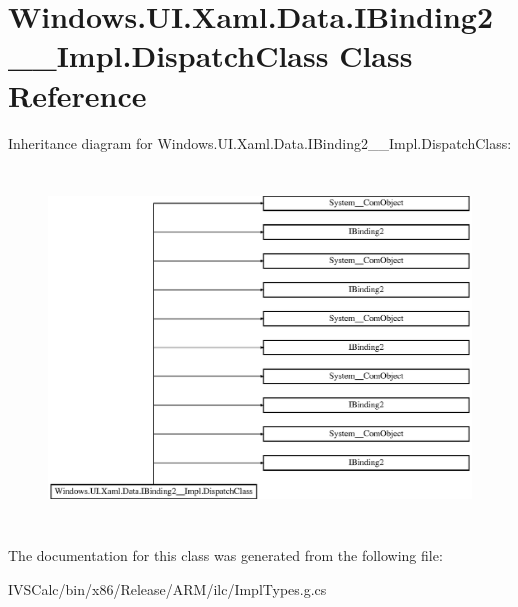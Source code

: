 \hypertarget{class_windows_1_1_u_i_1_1_xaml_1_1_data_1_1_i_binding2_____impl_1_1_dispatch_class}{}\section{Windows.\+U\+I.\+Xaml.\+Data.\+I\+Binding2\+\_\+\+\_\+\+Impl.\+Dispatch\+Class Class Reference}
\label{class_windows_1_1_u_i_1_1_xaml_1_1_data_1_1_i_binding2_____impl_1_1_dispatch_class}
Inheritance diagram for Windows.\+U\+I.\+Xaml.\+Data.\+I\+Binding2\+\_\+\+\_\+\+Impl.\+Dispatch\+Class\+:\begin{figure}[H]
\begin{center}
\leavevmode
\includegraphics[height=9.535604cm]{class_windows_1_1_u_i_1_1_xaml_1_1_data_1_1_i_binding2_____impl_1_1_dispatch_class}
\end{center}
\end{figure}


The documentation for this class was generated from the following file\+:\begin{DoxyCompactItemize}
\item 
I\+V\+S\+Calc/bin/x86/\+Release/\+A\+R\+M/ilc/Impl\+Types.\+g.\+cs\end{DoxyCompactItemize}
